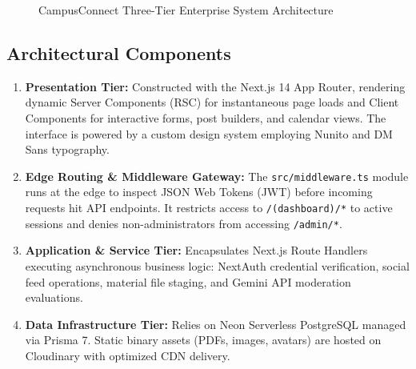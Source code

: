 \documentclass[12pt, a4paper, oneside]{report}
\begin{document}
\begin{figure}[H]
{
}
\caption{CampusConnect Three-Tier Enterprise System Architecture}
\label{fig:sys_arch}
\end{figure}

\subsection{Architectural Components}
\begin{enumerate}[leftmargin=0.7cm]
    \item \textbf{Presentation Tier:} Constructed with the Next.js 14 App Router, rendering dynamic Server Components (RSC) for instantaneous page loads and Client Components for interactive forms, post builders, and calendar views. The interface is powered by a custom design system employing Nunito and DM Sans typography.
    \item \textbf{Edge Routing \& Middleware Gateway:} The \texttt{src/middleware.ts} module runs at the edge to inspect JSON Web Tokens (JWT) before incoming requests hit API endpoints. It restricts access to \texttt{/(dashboard)/*} to active sessions and denies non-administrators from accessing \texttt{/admin/*}.
    \item \textbf{Application \& Service Tier:} Encapsulates Next.js Route Handlers executing asynchronous business logic: NextAuth credential verification, social feed operations, material file staging, and Gemini API moderation evaluations.
    \item \textbf{Data Infrastructure Tier:} Relies on Neon Serverless PostgreSQL managed via Prisma 7. Static binary assets (PDFs, images, avatars) are hosted on Cloudinary with optimized CDN delivery.
\end{enumerate}
\end{document}
